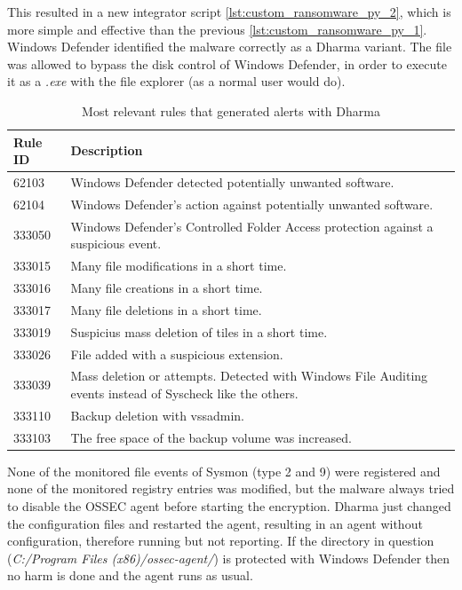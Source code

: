 \linej
This resulted in a new integrator script \ref{lst:custom_ransomware_py_2}, which is more simple and effective than the previous \ref{lst:custom_ransomware_py_1}.
\linej
\linej
Windows Defender identified the malware correctly as a Dharma variant.
The file was allowed to bypass the disk control of Windows Defender, in order to execute it as a \textit{.exe} with the file explorer (as a normal user would do).
\linej
\begin{table}[H]
	\begin{tabularx}{\textwidth}{|l|X|}
		\hline
		\rowcolor{gray!30}
		Rule ID & Description \\ \hline
		62103 & Windows Defender detected potentially unwanted software.\\ \hline
		62104 & Windows Defender's action against potentially unwanted software.\\ \hline
		333050 & Windows Defender's Controlled Folder Access protection against a suspicious event.\\ \hline
		333015 & Many file modifications in a short time.\\ \hline
		333016 & Many file creations in a short time.\\ \hline
		333017 & Many file deletions in a short time.\\ \hline
		333019 & Suspicius mass deletion of tiles in a short time.\\ \hline
		333026 & File added with a suspicious extension.\\ \hline
		333039 & Mass deletion or attempts. Detected with Windows File Auditing events instead of Syscheck like the others.\\ \hline
		333110 & Backup deletion with vssadmin.\\ \hline
		333103 & The free space of the backup volume was increased.\\ \hline
	\end{tabularx}
	\caption{Most relevant rules that generated alerts with Dharma}
\end{table}
\linej
None of the monitored file events of Sysmon (type 2 and 9) were registered and none of the monitored registry entries was modified, but the malware always tried to disable the OSSEC agent before starting the encryption.
Dharma just changed the configuration files and restarted the agent, resulting in an agent without configuration, therefore running but not reporting.
If the directory in question (\textit{C:/Program Files (x86)/ossec-agent/}) is protected with Windows Defender then no harm is done and the agent runs as usual.

